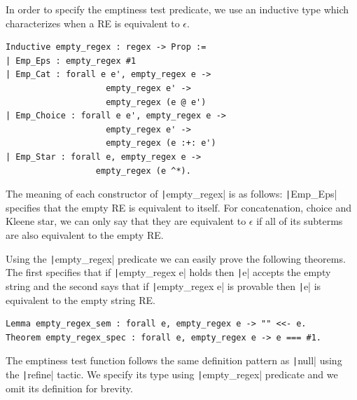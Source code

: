 \documentclass[oneside,12pt]{scrbook}
\theoremstyle{definition}
\newcommand{\coq}[1]{\texttt|#1|}
\theoremstyle{plain}
\theoremstyle{definition}
\begin{document}
In order to specify the emptiness test predicate, we use an inductive type
which characterizes when a RE is equivalent to $\epsilon$.
\begin{verbatim}
Inductive empty_regex : regex -> Prop :=
| Emp_Eps : empty_regex #1
| Emp_Cat : forall e e', empty_regex e ->
                    empty_regex e' ->
                    empty_regex (e @ e')
| Emp_Choice : forall e e', empty_regex e ->
                    empty_regex e' ->
                    empty_regex (e :+: e')
| Emp_Star : forall e, empty_regex e ->
                  empty_regex (e ^*).
\end{verbatim}
The meaning of each constructor of \coq{empty_regex} is as follows:
\coq{Emp_Eps} specifies that the empty RE is equivalent to itself.
For concatenation, choice and Kleene star, we can only say that they are
equivalent to $\epsilon$ if all of its subterms are also equivalent
to the empty RE.

Using the \coq{empty_regex} predicate we can easily prove the following
theorems. The first specifies that if \coq{empty_regex e} holds then
\coq{e} accepts the empty string and the second says that if
\coq{empty_regex e} is provable then \coq{e} is equivalent to the empty string RE.

\begin{verbatim}
Lemma empty_regex_sem : forall e, empty_regex e -> "" <<- e.
Theorem empty_regex_spec : forall e, empty_regex e -> e === #1.
\end{verbatim}

The emptiness test function follows the same definition pattern as \coq{null}
using the \coq{refine} tactic. We specify its type using \coq{empty_regex}
predicate and we omit its definition for brevity.
\end{document}
